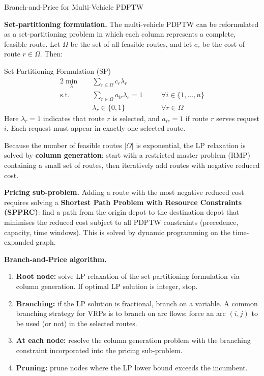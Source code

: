 \documentclass[aspectratio=169,10pt]{beamer}
\begin{document}
\begin{frame}[allowframebreaks]{Branch-and-Price for Multi-Vehicle PDPTW}

  \textbf{Set-partitioning formulation.} The multi-vehicle PDPTW can be reformulated as
  a set-partitioning problem in which each column represents a complete, feasible route.
  Let $\Omega$ be the set of all feasible routes, and let $c_r$ be the cost of route
  $r \in \Omega$. Then:

  \begin{block}{Set-Partitioning Formulation (SP)}
    \begin{alignat}{2}
      \min_{\lambda} &\quad \sum_{r \in \Omega} c_r \lambda_r && \\
      \text{s.t.} &\quad \sum_{r \in \Omega} a_{ir} \lambda_r = 1 \quad && \forall i \in \{1,\ldots,n\} \\
                  &\quad \lambda_r \in \{0,1\} && \forall r \in \Omega
    \end{alignat}
    Here $\lambda_r = 1$ indicates that route $r$ is selected, and $a_{ir} = 1$ if
    route $r$ serves request $i$. Each request must appear in exactly one selected route.
  \end{block}

  Because the number of feasible routes $|\Omega|$ is exponential, the LP relaxation is
  solved by \textbf{column generation}: start with a restricted master problem (RMP)
  containing a small set of routes, then iteratively add routes with negative reduced cost.

  \textbf{Pricing sub-problem.} Adding a route with the most negative reduced cost requires
  solving a \textbf{Shortest Path Problem with Resource Constraints (SPPRC)}: find a path
  from the origin depot to the destination depot that minimises the reduced cost subject
  to all PDPTW constraints (precedence, capacity, time windows). This is solved by dynamic
  programming on the time-expanded graph.

  \framebreak

  \textbf{Branch-and-Price algorithm.}
  \begin{enumerate}
    \item \textbf{Root node:} solve LP relaxation of the set-partitioning formulation via
          column generation. If optimal LP solution is integer, stop.
    \item \textbf{Branching:} if the LP solution is fractional, branch on a variable. A
          common branching strategy for VRPs is to branch on arc flows: force an arc
          $(i,j)$ to be used (or not) in the selected routes.
    \item \textbf{At each node:} resolve the column generation problem with the branching
          constraint incorporated into the pricing sub-problem.
    \item \textbf{Pruning:} prune nodes where the LP lower bound exceeds the incumbent.
  \end{enumerate}


\end{frame}
\end{document}
